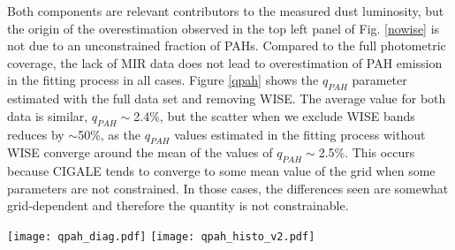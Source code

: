 \documentclass{aa}
\begin{document}
Both components are relevant contributors to the measured dust luminosity, but the origin of the overestimation observed in the top left panel of Fig. \ref{nowise} is not due to an unconstrained fraction of PAHs. Compared to the full photometric coverage, the lack of MIR data does not lead to overestimation of PAH emission in the fitting process 
in all cases. Figure \ref{qpah} shows the $q_{PAH}$ parameter estimated with the full data set and removing WISE. The average value for both data is similar, $q_{PAH} \sim$2.4\%, but the scatter when we exclude WISE bands reduces by $\sim$50\%, as the $q_{PAH}$ values estimated in the fitting process without WISE converge around the mean of the values of $q_{PAH} \sim$2.5\%. This occurs because CIGALE tends to converge to some mean value of the grid when some parameters are not constrained. In those cases, the differences seen are somewhat grid-dependent and therefore the quantity is not constrainable.

 \begin{figure*}\begin{center}
 \texttt{[image: qpah\_diag.pdf]}
  \texttt{[image: qpah\_histo\_v2.pdf]}
 \end{center} 
 \caption{Left panel: $q_{pah}$ parameter of \cite{dra} obtained with CIGALE \citep{nol} using the full photometric coverage (ordinate) or removing WISE data (abscissa). Solid lines show a linear correlation between the two quantities and the black cross in the bottom right corner shows the average errors in the fit. Right panel: Histograms of $q_{pah}$ from the full photometric coverage (red dashed line) or removing WISE data (black solid line).}\label{qpah}\end{figure*}
\end{document}
